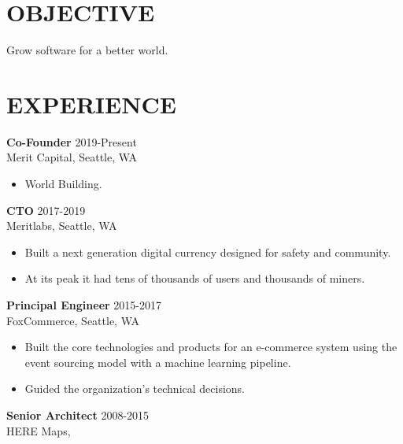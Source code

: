 \documentclass[line,margin]{res}
\begin{document}
\address{{\bf www.mempko.com}}
\address{{\bf max@mempko.com}}

\begin{resume}
 
\section{OBJECTIVE}       
                Grow software for a better world.
 
\section{EXPERIENCE} 
                {\bf Co-Founder} \hfill 2019-Present \\
                Merit Capital, 
                Seattle, WA
                 \begin{itemize}  \itemsep -2pt %
                    \item World Building.
                 \end{itemize}
                {\bf CTO} \hfill 2017-2019 \\
                Meritlabs, 
                Seattle, WA
                 \begin{itemize}  \itemsep -2pt %
                    \item Built a next generation digital currency designed
                        for safety and community.
                    \item At its peak it had tens of thousands of users and thousands of miners.
                 \end{itemize}
                {\bf Principal Engineer} \hfill 2015-2017 \\
                FoxCommerce, 
                Seattle, WA
                 \begin{itemize}  \itemsep -2pt %
                    \item Built the core technologies and products for an e-commerce system 
                        using the event sourcing model with a machine learning pipeline.
                    \item Guided the organization's technical decisions.
                 \end{itemize}
                {\bf Senior Architect} \hfill 2008-2015 \\
                HERE Maps, 

\end{resume}
\end{document}
